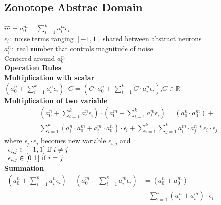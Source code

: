 \documentclass[11pt]{extarticle}
\begin{document}
\begin{multicols*}{3}
			\subsection*{Zonotope Abstrac Domain}
			$\hat { m } = a _ { 0 } ^ { m } + \sum _ { i = 1 } ^ { k } a _ { i } ^ { m } \epsilon _ { i }$\\
			$\epsilon _ { i } :$ noise terms ranging $[ - 1,1 ]$ shared between abstract neurons\\
			$a _ { i } ^ { n } :$ real number that controls magnitude of noise\\
			Centered around $a _ { 0 } ^ { m }$\\
			\textbf{Operation Rules}\\
			\textbf{Multiplication with scalar}\\
			$\left( a _ { 0 } ^ { n } + \sum _ { i = 1 } ^ { k } a _ { i } ^ { n } \epsilon _ { i } \right) \cdot C = \left( C \cdot a _ { 0 } ^ { n } + \sum _ { i = 1 } ^ { k } C \cdot a _ { i } ^ { n } \epsilon _ { i } \right) \text{,} C \in \mathbb{R} $\\
			\textbf{Multiplication of two variable}\\
			\begin{multline*}
    			\left( a _ { 0 } ^ { n } + \sum _ { i = 1 } ^ { k } a _ { i } ^ { n } \epsilon _ { i } \right) \cdot \left( a _ { 0 } ^ { m } + \sum _ { i = 1 } ^ { k } a _ { i } ^ { m } \epsilon _ { i } \right) = \left( a _ { 0 } ^ { n } \cdot a _ { 0 } ^ { m } \right) + \\
    			\sum _ { i = 1 } ^ { k } \left( a _ { i } ^ { n } \cdot a _ { 0 } ^ { m } + a _ { i } ^ { m } \cdot a _ { 0 } ^ { n } \right) \cdot \epsilon _ { i } + \sum _ { i = 1 } ^ { k } \sum _ { j = 1 } ^ { k } a _ { i } ^ { m } \cdot a _ { j } ^ { n } * \epsilon_i \cdot \epsilon_j
			\end{multline*}
			where $\epsilon _ { i } \cdot \epsilon _ { j }$ becomes new variable $\epsilon _ { i, j }$ and \\
			$\begin{array} { l l } { \epsilon _ { i , j } \in [ - 1,1 ] \text { if } i \neq j } \\ 
			{\epsilon _ { i , j } \in [ 0,1 ] \text { if } i = j } \end{array}$\\

			\textbf{Summation}\\
			$\begin{aligned}
			\left( a _ { 0 } ^ { n } + \sum _ { i = 1 } ^ { k } a _ { i } ^ { n } \epsilon _ { i } \right) + \left( a _ { 0 } ^ { m } + \sum _ { i = 1 } ^ { k } a _ { i } ^ { m } \epsilon _ { i } \right) & = \left( a _ { 0 } ^ { n } + a _ { 0 } ^ { m } \right) \\
			& + \sum _ { i = 1 } ^ { k } \left( a _ { i } ^ { n } + a _ { i } ^ { m } \right) \cdot \epsilon _ { i }
			\end{aligned}$\\
			

\end{multicols*}
\end{document}
